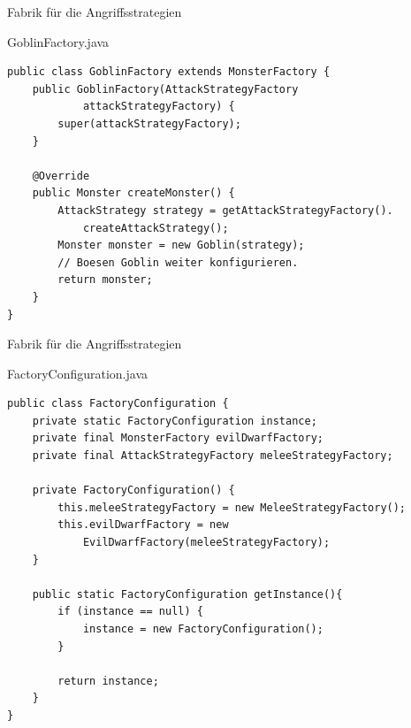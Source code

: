 \begin{frame}[fragile]{Fabrik für die Angriffsstrategien}
	\begin{exampleblock}{GoblinFactory.java}
		\begin{lstlisting}
public class GoblinFactory extends MonsterFactory {
	public GoblinFactory(AttackStrategyFactory 
			attackStrategyFactory) {
		super(attackStrategyFactory);
	}

	@Override
	public Monster createMonster() {
		AttackStrategy strategy = getAttackStrategyFactory().
			createAttackStrategy();
		Monster monster = new Goblin(strategy);
		// Boesen Goblin weiter konfigurieren.
		return monster;
	}
}
		\end{lstlisting}
	\end{exampleblock}
\end{frame}

\begin{frame}[fragile]{Fabrik für die Angriffsstrategien}
	\begin{exampleblock}{FactoryConfiguration.java}
		\begin{lstlisting}
public class FactoryConfiguration {
	private static FactoryConfiguration instance;
	private final MonsterFactory evilDwarfFactory;
	private final AttackStrategyFactory meleeStrategyFactory;
	
	private FactoryConfiguration() {
		this.meleeStrategyFactory = new MeleeStrategyFactory();
		this.evilDwarfFactory = new 
			EvilDwarfFactory(meleeStrategyFactory);
	}
	
	public static FactoryConfiguration getInstance(){
		if (instance == null) {
			instance = new FactoryConfiguration();
		}
		
		return instance;
	}
}
		\end{lstlisting}
	\end{exampleblock}
\end{frame}

